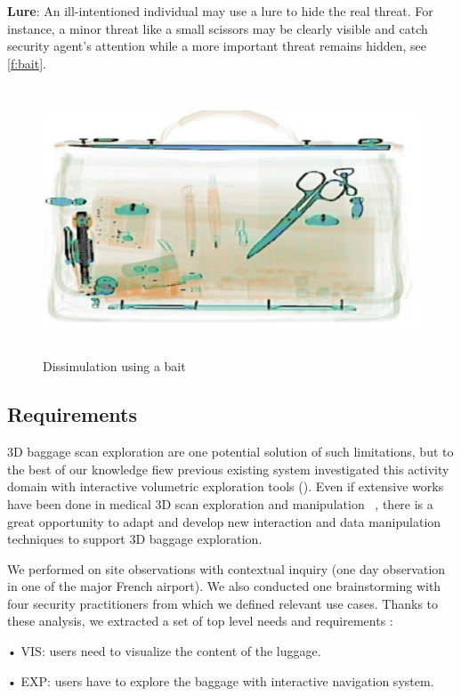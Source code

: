 \textbf{Lure}: An ill-intentioned individual may use a lure to hide the real threat. For instance, a minor threat like a small scissors may be clearly visible and catch security agent's attention while a more important threat remains hidden, see  \autoref{f:bait}.
\begin{figure}
\centering
	\includegraphics[height=8cm]{Figures/bait}
	\caption{Dissimulation using a bait}
	\label{f:bait}
\end{figure}

\subsection{ Requirements }


3D baggage scan exploration are one potential solution of such limitations, but to the best of our knowledge fiew previous existing system investigated this activity domain with interactive volumetric exploration tools (\cite{Li:2012:LVV:2425296.2425325}). Even if extensive works have been done in medical 3D scan exploration and manipulation ~\cite{preim2013visual}, there is a great opportunity to adapt and develop new interaction and data manipulation techniques to support 3D baggage exploration.

We performed on site observations with contextual inquiry (one day observation in one of the major French airport). We also conducted one brainstorming with four security practitioners from which we defined relevant use cases. Thanks to these analysis, we extracted a set of top level needs and requirements :

•	VIS: users need to visualize the content of the luggage.

•	EXP: users have to explore the baggage with interactive navigation system.

